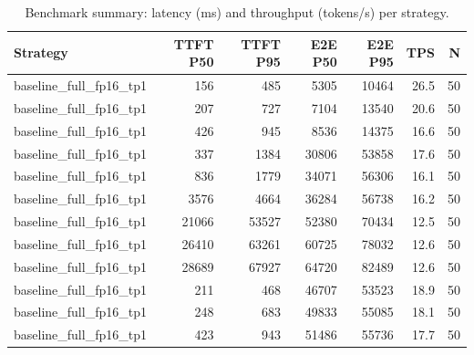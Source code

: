 \begin{table}
\caption{Benchmark summary: latency (ms) and throughput (tokens/s) per strategy.}
\label{tab:summary}
\begin{tabular}{lrrrrrr}
\toprule
Strategy & TTFT P50 & TTFT P95 & E2E P50 & E2E P95 & TPS & N \\
\midrule
baseline_full_fp16_tp1 & 156 & 485 & 5305 & 10464 & 26.5 & 50 \\
baseline_full_fp16_tp1 & 207 & 727 & 7104 & 13540 & 20.6 & 50 \\
baseline_full_fp16_tp1 & 426 & 945 & 8536 & 14375 & 16.6 & 50 \\
baseline_full_fp16_tp1 & 337 & 1384 & 30806 & 53858 & 17.6 & 50 \\
baseline_full_fp16_tp1 & 836 & 1779 & 34071 & 56306 & 16.1 & 50 \\
baseline_full_fp16_tp1 & 3576 & 4664 & 36284 & 56738 & 16.2 & 50 \\
baseline_full_fp16_tp1 & 21066 & 53527 & 52380 & 70434 & 12.5 & 50 \\
baseline_full_fp16_tp1 & 26410 & 63261 & 60725 & 78032 & 12.6 & 50 \\
baseline_full_fp16_tp1 & 28689 & 67927 & 64720 & 82489 & 12.6 & 50 \\
baseline_full_fp16_tp1 & 211 & 468 & 46707 & 53523 & 18.9 & 50 \\
baseline_full_fp16_tp1 & 248 & 683 & 49833 & 55085 & 18.1 & 50 \\
baseline_full_fp16_tp1 & 423 & 943 & 51486 & 55736 & 17.7 & 50 \\
\bottomrule
\end{tabular}
\end{table}
